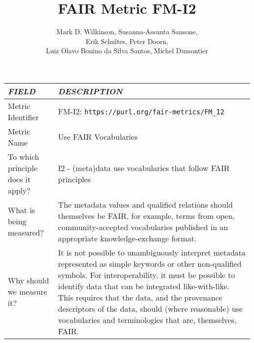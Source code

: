 \documentclass[english]{article}
\begin{document}
\title{FAIR Metric FM-I2}

\author{Mark D. Wilkinson, Susanna-Assunta Sansone, \\Erik Schultes, Peter Doorn,\\ 
Luiz Olavo Bonino da Silva Santos, Michel Dumontier}

\maketitle

\newpage





\begin{longtable}{|p{5cm}|p{9cm}|}


\hline
\emph{FIELD} & \emph{DESCRIPTION} \\
\hline
Metric Identifier &   FM-I2: \verb"https://purl.org/fair-metrics/FM_I2"
\\


\hline
Metric Name &   


Use FAIR Vocabularies


 \\



\hline
To which principle does it apply? &   




I2 - (meta)data use vocabularies that follow FAIR principles

\\



\hline
What is being measured? & 




The metadata values and qualified relations should themselves be FAIR, for example, terms from open, community-accepted vocabularies published in an appropriate knowledge-exchange format.


\\



\hline
Why should we measure it? & 





It is not possible to unambiguously interpret metadata represented as simple keywords or other non-qualified symbols.  For interoperability, it must be possible to identify data that can be integrated like-with-like.  This requires that the data, and the provenance descriptors of the data, should (where reasonable) use vocabularies and terminologies that are, themselves, FAIR.
  

\end{longtable}
\end{document}
